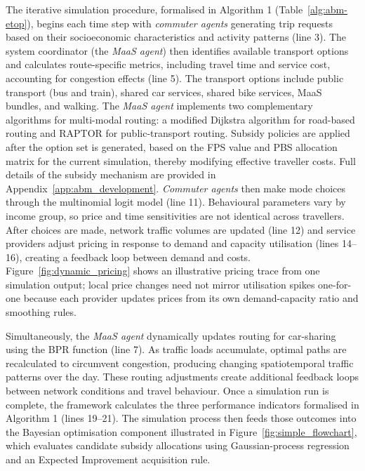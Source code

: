 \documentclass[a4paper,fleqn]{cas-sc}
\begin{document}
The iterative simulation procedure, formalised in Algorithm 1 (Table~\ref{alg:abm-etop}), begins each time step with \textit{commuter agents} generating trip requests based on their socioeconomic characteristics and activity patterns (line 3). The system coordinator (the \textit{MaaS agent}) then identifies available transport options and calculates route-specific metrics, including travel time and service cost, accounting for congestion effects (line 5). The transport options include public transport (bus and train), shared car services, shared bike services, MaaS bundles, and walking. The \textit{MaaS agent} implements two complementary algorithms for multi-modal routing: a modified Dijkstra algorithm for road-based routing and RAPTOR for public-transport routing. Subsidy policies are applied after the option set is generated, based on the FPS value and PBS allocation matrix for the current simulation, thereby modifying effective traveller costs. Full details of the subsidy mechanism are provided in Appendix~\ref{app:abm_development}. \textit{Commuter agents} then make mode choices through the multinomial logit model (line 11). Behavioural parameters vary by income group, so price and time sensitivities are not identical across travellers. After choices are made, network traffic volumes are updated (line 12) and service providers adjust pricing in response to demand and capacity utilisation (lines 14--16), creating a feedback loop between demand and costs. Figure~\ref{fig:dynamic_pricing} shows an illustrative pricing trace from one simulation output; local price changes need not mirror utilisation spikes one-for-one because each provider updates prices from its own demand-capacity ratio and smoothing rules.

Simultaneously, the \textit{MaaS agent} dynamically updates routing for car-sharing using the BPR function (line 7). As traffic loads accumulate, optimal paths are recalculated to circumvent congestion, producing changing spatiotemporal traffic patterns over the day. These routing adjustments create additional feedback loops between network conditions and travel behaviour. Once a simulation run is complete, the framework calculates the three performance indicators formalised in Algorithm 1 (lines 19--21). The simulation process then feeds those outcomes into the Bayesian optimisation component illustrated in Figure~\ref{fig:simple_flowchart}, which evaluates candidate subsidy allocations using Gaussian-process regression and an Expected Improvement acquisition rule.
\end{document}

